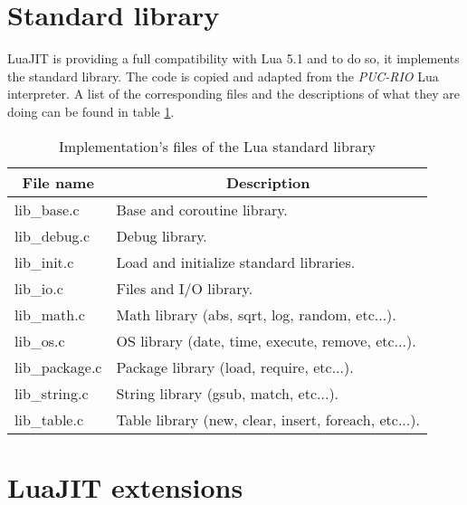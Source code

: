 
\section{Standard library}
\label{Sec:std-lib}

LuaJIT is providing a full compatibility with Lua 5.1 and to do so, it
implements the standard library. The code is copied and adapted from the
\emph{PUC-RIO} Lua interpreter. A list of the corresponding files and the
descriptions of what they are doing can be found in table
\ref{tab:library-std-files}.

\begin{table}[H]
\centering
\caption{Implementation's files of the Lua standard library}
\label{tab:library-std-files}
\begin{tabular}{|l|l|}
\hline
\multicolumn{1}{|c|}{File name} & \multicolumn{1}{c|}{Description}                     \\ \hline
lib\_base.c                     & Base and coroutine library.                          \\
lib\_debug.c                    & Debug library.                                       \\
lib\_init.c                     & Load and initialize standard libraries.              \\
lib\_io.c                       & Files and I/O library.                               \\
lib\_math.c                     & Math library (abs, sqrt, log, random, etc...).       \\
lib\_os.c                       & OS library (date, time, execute, remove, etc...).    \\
lib\_package.c                  & Package library (load, require, etc...).             \\
lib\_string.c                   & String library (gsub, match, etc...).                \\
lib\_table.c                    & Table library (new, clear, insert, foreach, etc...). \\ \hline
\end{tabular}
\end{table}

\section{LuaJIT extensions}
\label{Sec:lj-extensions}

